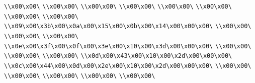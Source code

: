 \verb|\\x00\x00\|\newline
\verb|\\x00\x00\|\newline
\verb|\\x00\x00\|\newline
\verb|\\x00\x00\|\newline
\verb|\\x00\x00\|\newline
\verb|\\x00\x00\|\newline
\verb|\\x00\x00\|\newline
\verb|\\x00\x00\|\newline
\verb|\\x09\x00\x3b\x00\x0a\x00\x15\x00\x0b\x00\x14\x00\x00\x00\|\newline
\verb|\\x00\x00\|\newline
\verb|\\x00\x00\|\newline
\verb|\\x00\x00\|\newline
\verb|\\x0e\x00\x3f\x00\x0f\x00\x3e\x00\x10\x00\x3d\x00\x00\x00\|\newline
\verb|\\x00\x00\|\newline
\verb|\\x00\x00\|\newline
\verb|\\x00\x00\|\newline
\verb|\\x0d\x00\x43\x00\x10\x00\x2d\x00\x00\x00\|\newline
\verb|\\x0c\x00\x44\x00\x0d\x00\x2e\x00\x10\x00\x2d\x00\x00\x00\|\newline
\verb|\\x00\x00\|\newline
\verb|\\x00\x00\|\newline
\verb|\\x00\x00\|\newline
\verb|\\x00\x00\|\newline
\verb|\\x00\x00\|\newline
